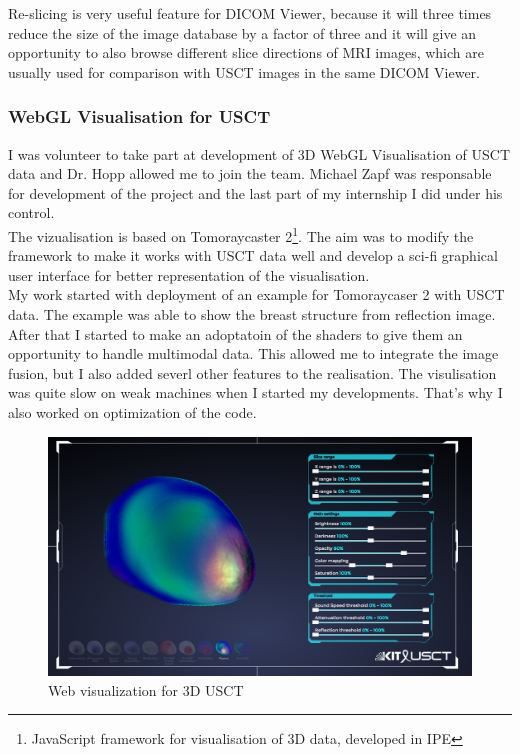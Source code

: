 \documentclass[english]{article}
\begin{document}
Re-slicing is very useful feature for DICOM Viewer, because it will three times reduce the size of the image database by a factor of three and it will give an opportunity to also browse different slice directions of MRI images, which are usually used for comparison with USCT images in the same DICOM Viewer.\\

\subsubsection{WebGL Visualisation for USCT}

I was volunteer to take part at development of 3D WebGL Visualisation of USCT data and Dr. Hopp allowed me to join the team. Michael Zapf was responsable for development of the project and the last part of my internship I did under his control.\\

The vizualisation is based on Tomoraycaster 2\footnote{JavaScript framework for visualisation of 3D data, developed in IPE}. The aim was to modify the framework to make it works with USCT data well and develop a sci-fi graphical user interface for better representation of the visualisation.\\

My work started with deployment of an example for Tomoraycaser 2 with USCT data. The example was able to show the breast structure from reflection image. After that I started to make an adoptatoin of the shaders to give them an opportunity to handle multimodal data. This allowed me to integrate the image fusion, but I also added severl other features to the realisation. The visulisation was quite slow on weak machines when I started my developments. That's why I also worked on optimization of the code.\\

\begin{figure}[H]
\centerline{\includegraphics[scale=0.4]{internship_report/usct}}
\caption{Web visualization for 3D USCT\label{fig:usct}}
\end{figure}
\end{document}
